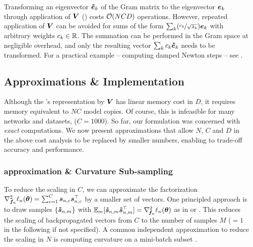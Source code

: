 Transforming an eigenvector $\bm{\tilde{e}}_k$ of the Gram matrix to the \ggn
eigenvector ${\bm{e}}_k$ through application of ${\bm{V}}$
() costs ${\mathcal{O}}(NCD)$ operations. However,
repeated application of ${\bm{V}}$ can be avoided for sums of the form $\sum_k
(\nicefrac{c_k}{\sqrt{\lambda_k}}) {\bm{e}}_k $ with arbitrary weights $c_k \in {\mathbb{R}}$.
The summation can be performed in the Gram space at negligible overhead, and
only the resulting vector $\sum_k c_k \bm{\tilde{e}}_k$ needs to be transformed. For a
practical example -- computing damped Newton steps -- see
.


\subsection{Approximations \& Implementation}
\label{vivit::sec:approximations}

Although the \ggn's representation by ${\bm{V}}$ has linear memory cost in $D$, it
requires memory equivalent to $NC$ model copies. Of course, this is infeasible for
many networks and datasets, \eg \imagenet ($C=1000$). So far, our formulation
was concerned with \emph{exact} computations. We now present approximations that
allow $N$, $C$ and $D$ in the above cost analysis to be replaced by smaller
numbers, enabling \vivit to trade-off accuracy and performance.


\subsubsection{\mc approximation \& Curvature Sub-sampling}

To reduce the scaling in $C$, we can approximate the factorization
$\nabla^2_{{\bm{f}}_n}\ell_n({\bm{\theta}}) = \sum_{c=1}^C {\bm{s}}_{n,c} {\bm{s}}_{n,c}^\top$ by a
smaller set of vectors. One principled approach is to draw \mc samples
$\{\bm{\tilde{s}}_{n,m}\}$ with $\mathbb{E}_m[ \bm{\tilde{s}}_{n,m} \bm{\tilde{s}}_{n,m}^\top] =
\nabla_{\!{{\bm{f}}_n}}^{2}\ell_n({\bm{\theta}})$ as in \cite{dangel2020backpack} or
. This reduces the scaling of
backpropagated vectors from $C$ to the number of \mc samples $M$ ($=1$ in the
following if not specified). A common independent approximation to
reduce the scaling in $N$ is computing curvature on a mini-batch subset
\citep{byrd2011use, zhang2017blockdiagonal}.

